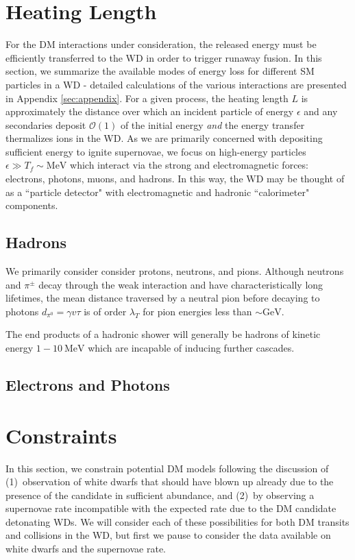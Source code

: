 \documentclass[twocolumn,showpacs,preprintnumbers,amsmath,amssymb,prd]{revtex4}
\newcommand{\OO}{\mathcal{O}}
\begin{document}
\section{Heating Length}
\label{sec:HeatingLength}
For the DM interactions under consideration, the released energy must be efficiently transferred to the WD in order to trigger runaway fusion. In this section, we summarize the available modes of energy loss for different SM particles in a WD - detailed calculations of the various interactions are presented in Appendix \ref{sec:appendix}. For a given process, the heating length $L$ is approximately the distance over which an incident particle of energy $\epsilon$ and any secondaries deposit $\OO(1)$ of the initial energy \emph{and} the energy transfer thermalizes ions in the WD. As we are primarily concerned with depositing sufficient energy to ignite supernovae, we focus on high-energy particles $\epsilon \gg T_f \sim \text{MeV}$ which interact via the strong and electromagnetic forces: electrons, photons, muons, and hadrons. In this way, the WD may be thought of as a ``particle detector" with electromagnetic and hadronic ``calorimeter" components.

\subsection{Hadrons}
We primarily consider consider protons, neutrons, and pions. Although neutrons and $\pi^\pm$ decay through the weak interaction and have characteristically long lifetimes, the mean distance traversed by a neutral pion before decaying to photons $d_{\pi^0} = \gamma v \tau$ is of order $\lambda_T$ for pion energies less than $\sim \text{GeV}$.

The end products of a hadronic shower will generally be hadrons of kinetic energy $1-10 ~\text{MeV}$ which are incapable of inducing further cascades.

\subsection{Electrons and Photons}

\section{Constraints}
\label{sec:Constraints}

In this section, we constrain potential DM models following the discussion of \cite{Graham:2015apa} (1)~observation of white dwarfs that should have blown up already due to the presence of the candidate in sufficient abundance, and (2)~by observing a supernovae rate incompatible with the expected rate due to the DM candidate detonating WDs. We will consider each of these possibilities for both DM transits and collisions in the WD, but first we pause to consider the data available on white dwarfs and the supernovae rate.
\end{document}
